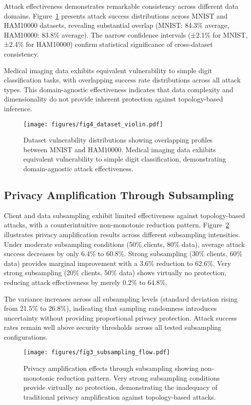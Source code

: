 Attack effectiveness demonstrates remarkable consistency across different data domains. Figure~\ref{fig:dataset_violin} presents attack success distributions across MNIST and HAM10000 datasets, revealing substantial overlap (MNIST: 84.3\% average, HAM10000: 83.8\% average). The narrow confidence intervals (±2.1\% for MNIST, ±2.4\% for HAM10000) confirm statistical significance of cross-dataset consistency.

Medical imaging data exhibits equivalent vulnerability to simple digit classification tasks, with overlapping success rate distributions across all attack types. This domain-agnostic effectiveness indicates that data complexity and dimensionality do not provide inherent protection against topology-based inference.

\begin{figure}[!t]
\centering
\texttt{[image: figures/fig4\_dataset\_violin.pdf]}
\caption{Dataset vulnerability distributions showing overlapping profiles between MNIST and HAM10000. Medical imaging data exhibits equivalent vulnerability to simple digit classification, demonstrating domain-agnostic attack effectiveness.}
\label{fig:dataset_violin}
\end{figure}

\subsection{Privacy Amplification Through Subsampling}

Client and data subsampling exhibit limited effectiveness against topology-based attacks, with a counterintuitive non-monotonic reduction pattern. Figure~\ref{fig:subsampling_flow} illustrates privacy amplification results across different subsampling intensities. Under moderate subsampling conditions (50\% clients, 80\% data), average attack success decreases by only 6.4\% to 60.8\%. Strong subsampling (30\% clients, 60\% data) provides marginal improvement with a 3.6\% reduction to 62.6\%. Very strong subsampling (20\% clients, 50\% data) shows virtually no protection, reducing attack effectiveness by merely 0.2\% to 64.8\%.

The variance increases across all subsampling levels (standard deviation rising from 21.5\% to 26.8\%), indicating that sampling randomness introduces uncertainty without providing proportional privacy protection. Attack success rates remain well above security thresholds across all tested subsampling configurations.

\begin{figure}[!t]
\centering
\texttt{[image: figures/fig3\_subsampling\_flow.pdf]}
\caption{Privacy amplification effects through subsampling showing non-monotonic reduction pattern. Very strong subsampling conditions provide virtually no protection, demonstrating the inadequacy of traditional privacy amplification against topology-based attacks.}
\label{fig:subsampling_flow}
\end{figure}